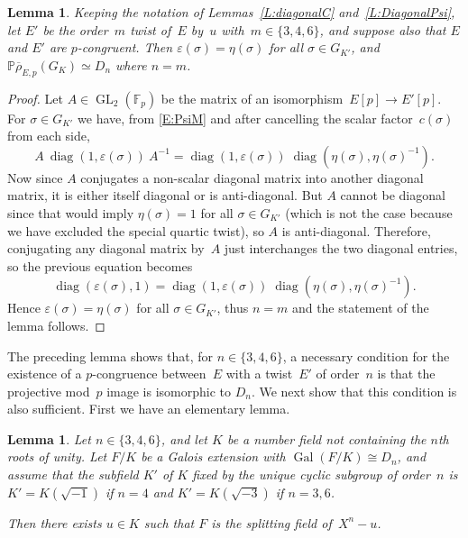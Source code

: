 \documentclass[twoside,leqno,symbols-for-thanks, draft]{rmi}
\numberwithin{equation}{section}
\newcommand{\Fp}{\mathbb{F}_p}
\newcommand{\PP}{\mathbb{P}}
\newcommand{\rhobar}{{\overline{\rho}}}
\newcommand{\eps}{\varepsilon}
\DeclareMathOperator{\Gal}{Gal}
\newcommand{\GL}{\operatorname{GL}}
\newcommand{\diag}{{\operatorname{diag}}}
\newtheorem{lemma}[theorem]{Lemma}
\theoremstyle{remark}
\begin{document}
\begin{lemma}\label{L:EpsEta}
  Keeping the notation of Lemmas~\ref{L:diagonalC}
  and~\ref{L:DiagonalPsi}, let $E'$ be the order~$m$ twist of~$E$
  by~$u$ with~$m \in \{3,4,6\}$, and suppose also that $E$ and $E'$
  are $p$-congruent.  Then $\eps(\sigma)=\eta(\sigma)$ for all
  $\sigma\in G_{K'}$, and $\PP \rhobar_{E,p}(G_K) \simeq D_n$ where
  $n=m$.
\end{lemma}
\begin{proof}
  Let $A\in\GL_2(\Fp)$ be the matrix of an isomorphism~$E[p]\to
  E'[p]$.  For $\sigma\in G_{K'}$ we have, from \eqref{E:PsiM} and
  after cancelling the scalar factor~$c(\sigma)$ from each side,
\[
A\ \diag(1,\eps(\sigma))\ A^{-1} = \diag(1,\eps(\sigma))\; \diag(\eta(\sigma),\eta(\sigma)^{-1}).
\]
Now since $A$ conjugates a non-scalar diagonal matrix into another
diagonal matrix, it is either itself diagonal or is anti-diagonal.
But $A$ cannot be diagonal since that would imply $\eta(\sigma)=1$ for
all $\sigma\in G_{K'}$ (which is not the case because we have excluded the special quartic twist), so $A$ is anti-diagonal.  Therefore, conjugating any
diagonal matrix by~$A$ just interchanges the two diagonal entries, so
the previous equation becomes
\[
\diag(\eps(\sigma),1) = \diag(1,\eps(\sigma))\; \diag(\eta(\sigma),\eta(\sigma)^{-1}).
\]
Hence $\eps(\sigma)=\eta(\sigma)$ for all $\sigma\in G_{K'}$, thus $n=m$ and the
statement of the lemma follows.
\end{proof}

The preceding lemma shows that, for $n\in\{3,4,6\}$, a necessary
condition for the existence of a $p$-congruence between~$E$ with a
twist~$E'$ of order~$n$ is that the projective mod~$p$ image is
isomorphic to $D_n$.  We next show that this condition is also
sufficient.  First we have an elementary lemma.

\begin{lemma}
Let $n\in\{3,4,6\}$, and let $K$ be a number field not containing the
$n$th roots of unity.  Let $F/K$ be a Galois extension with
$\Gal(F/K)\cong D_n$, and assume that the subfield $K'$ of $K$ fixed
by the unique cyclic subgroup of order~$n$ is $K'=K(\sqrt{-1})$ if
$n=4$ and $K'=K(\sqrt{-3})$ if $n=3,6$.

Then there exists $u\in K$ such that $F$ is the splitting field of~$X^n-u$.
\end{lemma}

\def\rnu{\root n\of u} \def\rnub{\root n\of {\overline{u}}}
\end{document}
